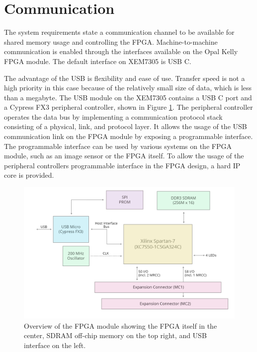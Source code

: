 \documentclass[12pt]{report}
\begin{document}
\section{Communication}
The system requirements state a communication channel to be available for shared memory usage and controlling the FPGA. Machine-to-machine communication is enabled through the interfaces available on the Opal Kelly FPGA module. The default interface on XEM7305 is USB C. \citep{XEM7305Man}
\par
The advantage of the USB is flexibility and ease of use. Transfer speed is not a high priority in this case because of the relatively small size of data, which is less than a megabyte. The USB module on the XEM7305 contains a USB C port and a Cypress FX3 peripheral controller, shown in Figure \ref{fig:xemOverview}.
The peripheral controller operates the data bus by implementing a communication protocol stack consisting of a physical, link, and protocol layer. It allows the usage of the USB communication link on the FPGA module by exposing a programmable interface. The programmable interface can be used by various systems on the FPGA module, such as an image sensor or the FPGA itself. To allow the usage of the peripheral controllers programmable interface in the FPGA design, a hard IP core is provided. \citep{XEM7305Man} \citep{FX3Man}

\begin{figure}
    \centering
    \includegraphics[scale=0.4]{figures/2XEM7305-BlockDiagram.png}
    \caption{Overview of the FPGA module showing the FPGA itself in the center, SDRAM off-chip memory on the top right, and USB interface on the left. \citep{XEM7305Man}}
    \label{fig:xemOverview}
\end{figure}
\end{document}
